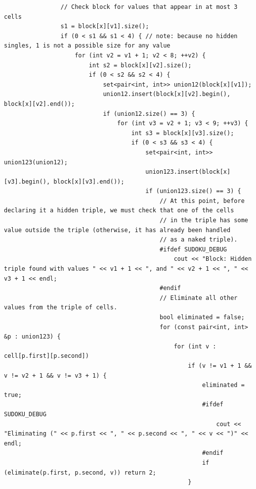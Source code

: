 \documentclass{article}
\begin{document}
\begin{lstlisting}
                // Check block for values that appear in at most 3 cells
                s1 = block[x][v1].size();
                if (0 < s1 && s1 < 4) { // note: because no hidden singles, 1 is not a possible size for any value
                    for (int v2 = v1 + 1; v2 < 8; ++v2) {
                        int s2 = block[x][v2].size();
                        if (0 < s2 && s2 < 4) {
                            set<pair<int, int>> union12(block[x][v1]);
                            union12.insert(block[x][v2].begin(), block[x][v2].end());
                            if (union12.size() == 3) {
                                for (int v3 = v2 + 1; v3 < 9; ++v3) {
                                    int s3 = block[x][v3].size();
                                    if (0 < s3 && s3 < 4) {
                                        set<pair<int, int>> union123(union12);
                                        union123.insert(block[x][v3].begin(), block[x][v3].end());
                                        if (union123.size() == 3) {
                                            // At this point, before declaring it a hidden triple, we must check that one of the cells
                                            // in the triple has some value outside the triple (otherwise, it has already been handled
                                            // as a naked triple).
                                            #ifdef SUDOKU_DEBUG
                                                cout << "Block: Hidden triple found with values " << v1 + 1 << ", and " << v2 + 1 << ", " << v3 + 1 << endl;
                                            #endif
                                            // Eliminate all other values from the triple of cells.
                                            bool eliminated = false;
                                            for (const pair<int, int> &p : union123) {
                                                for (int v : cell[p.first][p.second])
                                                    if (v != v1 + 1 && v != v2 + 1 && v != v3 + 1) {
                                                        eliminated = true;
                                                        #ifdef SUDOKU_DEBUG
                                                            cout << "Eliminating (" << p.first << ", " << p.second << ", " << v << ")" << endl;
                                                        #endif
                                                        if (eliminate(p.first, p.second, v)) return 2;
                                                    }

\end{lstlisting}
\end{document}
